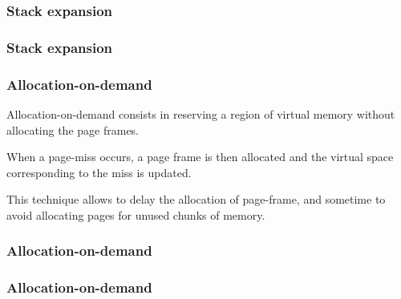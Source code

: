 
\begin{frame}
  \frametitle{Stack expansion}

  \begin{center}
  \end{center}

\end{frame}


\begin{frame}
  \frametitle{Stack expansion}

  \begin{center}
  \end{center}

\end{frame}


\begin{frame}
  \frametitle{Allocation-on-demand}

  Allocation-on-demand consists in reserving a region of virtual
  memory without allocating the page frames.

  \-

  When a page-miss occurs, a page frame is then allocated and the
  virtual space corresponding to the miss is updated.

  \-

  This technique allows to delay the allocation of page-frame, and
  sometime to avoid allocating pages for unused chunks of memory.

\end{frame}


\begin{frame}
  \frametitle{Allocation-on-demand}

  \begin{center}
  \end{center}

\end{frame}



\begin{frame}
  \frametitle{Allocation-on-demand}

  \begin{center}
  \end{center}

\end{frame}



